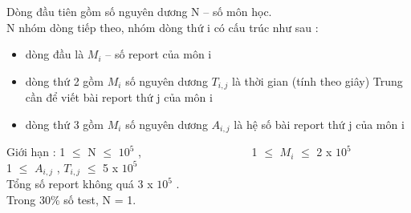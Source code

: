 Dòng đầu tiên gồm số nguyên dương N – số môn học.
\\N nhóm dòng tiếp theo, nhóm dòng thứ i có cấu trúc như sau :
\begin{itemize}
	\item dòng đầu là $M_{i}$ – số report của môn i
	\item dòng thứ 2 gồm $M_{i}$ số nguyên dương $T_{i,j}$ là thời gian (tính theo giây) Trung cần để viết bài report thứ j của môn i
	\item dòng thứ 3 gồm $M_{i}$ số nguyên dương $A_{i,j}$ là hệ số bài report thứ j của môn i
\end{itemize}

Giới hạn : 1  $\le$  N  $\le$  $10^{5}$ ,                    1  $\le$  $M_{i}$  $\le$  2 x $10^{5}$
\\1  $\le$  $A_{i,j}$ , $T_{i,j}$  $\le$  5 x $10^{5}$
\\Tổng số report không quá 3 x $10^{5}$ .
\\Trong 30\% số test, N = 1.